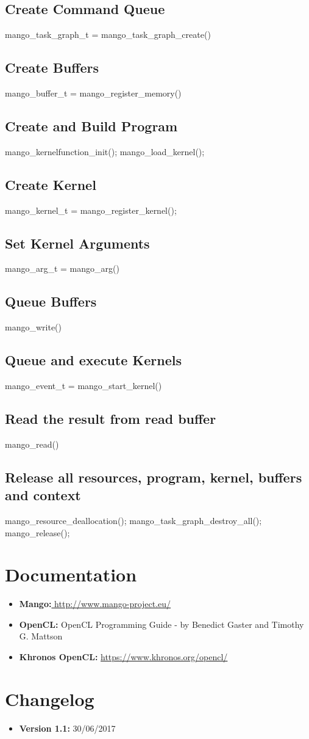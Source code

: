 \documentclass[a4paper]{article}
\begin{document}
\subsection{Create Command Queue}
\ttfamily mango\_task\_graph\_t = mango\_task\_graph\_create() \rmfamily
\subsection{Create Buffers}
\ttfamily mango\_buffer\_t = mango\_register\_memory() \rmfamily
\subsection{Create and Build Program}
\ttfamily mango\_kernelfunction\_init(); 
mango\_load\_kernel(); \rmfamily
\subsection{Create Kernel}
\ttfamily mango\_kernel\_t = mango\_register\_kernel();  \rmfamily
\subsection{Set Kernel Arguments}
\ttfamily mango\_arg\_t = mango\_arg() \rmfamily
\subsection{Queue Buffers}
\ttfamily mango\_write() \rmfamily
\subsection{Queue and execute Kernels}
\ttfamily mango\_event\_t = mango\_start\_kernel() \rmfamily
\subsection{Read the result from read buffer}
\ttfamily mango\_read() \rmfamily
\subsection{Release all resources, program, kernel, buffers and context}
\ttfamily mango\_resource\_deallocation(); 
mango\_task\_graph\_destroy\_all(); 
mango\_release(); \rmfamily

\newpage
\section{Documentation}
\begin{itemize}
	\item \textbf{Mango:}\url{ http://www.mango-project.eu/}
	\item \textbf{OpenCL:} OpenCL Programming Guide - by Benedict Gaster and Timothy G. Mattson
	\item \textbf{Khronos OpenCL:} \url{https://www.khronos.org/opencl/}
\end{itemize}
\newpage


\section{Changelog}
\begin{itemize}
\item \textbf {Version 1.1:} 30/06/2017
\end{itemize}
\end{document}

